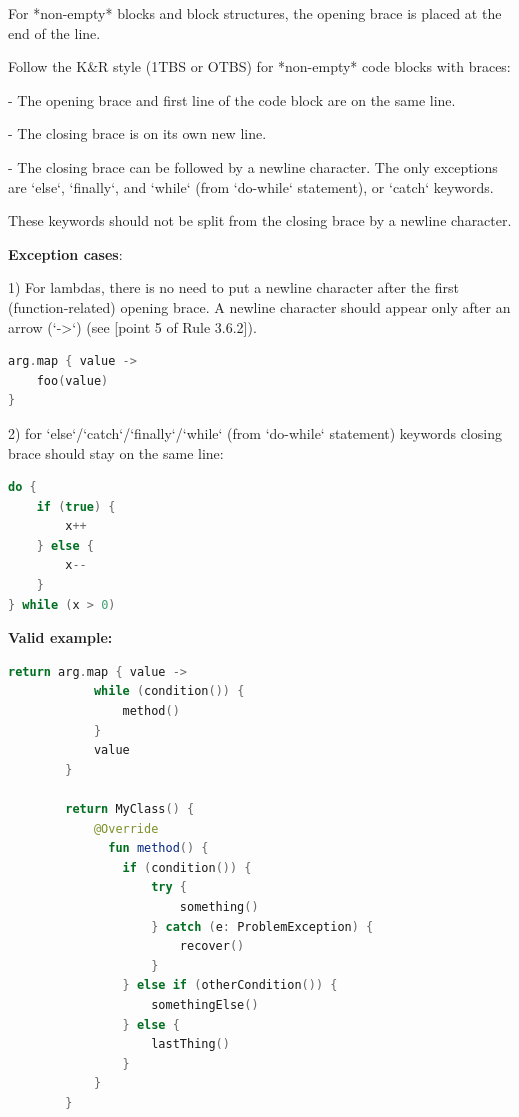 \label{sec:3.2.2}

For *non-empty* blocks and block structures, the opening brace is placed at the end of the line.

Follow the K\&R style (1TBS or OTBS) for *non-empty* code blocks with braces:

- The opening brace and first line of the code block are on the same line.

- The closing brace is on its own new line.

- The closing brace can be followed by a newline character. The only exceptions are `else`, `finally`, and `while` (from `do-while` statement), or `catch` keywords.

These keywords should not be split from the closing brace by a newline character.



\textbf{Exception cases}: 



1) For lambdas, there is no need to put a newline character after the first (function-related) opening brace. A newline character should appear only after an arrow (`->`) (see [point 5 of Rule 3.6.2]).



\begin{lstlisting}[language=Kotlin]
arg.map { value ->
    foo(value)
}
\end{lstlisting}


2) for `else`/`catch`/`finally`/`while` (from `do-while` statement) keywords closing brace should stay on the same line:

\begin{lstlisting}[language=Kotlin]
do {
    if (true) {
        x++
    } else {
        x--
    }
} while (x > 0) 
\end{lstlisting}
 

\textbf{Valid example:}



\begin{lstlisting}[language=Kotlin]
        return arg.map { value ->
            while (condition()) {
                method()
            }
            value 
        }

        return MyClass() {
            @Override
              fun method() {
                if (condition()) {
                    try {
                        something()
                    } catch (e: ProblemException) {
                        recover()
                    }
                } else if (otherCondition()) {
                    somethingElse()
                } else {
                    lastThing()
                }
            }
        }
\end{lstlisting}


